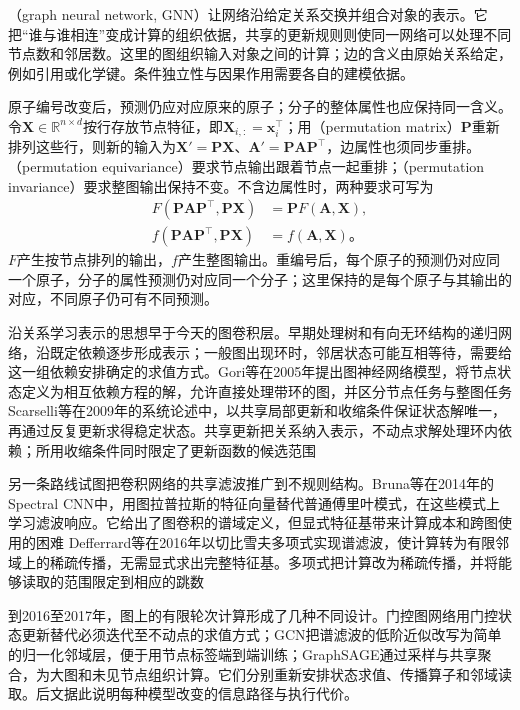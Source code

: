 （graph neural network, GNN）让网络沿给定关系交换并组合对象的表示。它把“谁与谁相连”变成计算的组织依据，共享的更新规则则使同一网络可以处理不同节点数和邻居数。这里的图组织输入对象之间的计算；边的含义由原始关系给定，例如引用或化学键。条件独立性与因果作用需要各自的建模依据。

原子编号改变后，预测仍应对应原来的原子；分子的整体属性也应保持同一含义。令$\bm{X}\in\mathbb{R}^{n\times d}$按行存放节点特征，即$\bm{X}_{i,:}=\bm{x}_i^{\top}$；用（permutation matrix）$\bm{P}$重新排列这些行，则新的输入为$\bm{X}'=\bm{P}\bm{X}$、$\bm{A}'=\bm{P}\bm{A}\bm{P}^{\top}$，边属性也须同步重排。（permutation equivariance）要求节点输出跟着节点一起重排；（permutation invariance）要求整图输出保持不变。不含边属性时，两种要求可写为
\begin{equation}
  \begin{aligned}
    F(\bm{P}\bm{A}\bm{P}^{\top},\bm{P}\bm{X})
      &=\bm{P}F(\bm{A},\bm{X}),\\
    f(\bm{P}\bm{A}\bm{P}^{\top},\bm{P}\bm{X})
      &=f(\bm{A},\bm{X})\text{。}
  \end{aligned}
  \label{eq:gnn-permutation}
\end{equation}
$F$产生按节点排列的输出，$f$产生整图输出。重编号后，每个原子的预测仍对应同一个原子，分子的属性预测仍对应同一个分子；这里保持的是每个原子与其输出的对应，不同原子仍可有不同预测。

沿关系学习表示的思想早于今天的图卷积层。早期处理树和有向无环结构的递归网络，沿既定依赖逐步形成表示；一般图出现环时，邻居状态可能互相等待，需要给这一组依赖安排确定的求值方式。Gori等在2005年提出图神经网络模型，将节点状态定义为相互依赖方程的解，允许直接处理带环的图，并区分节点任务与整图任务 Scarselli等在2009年的系统论述中，以共享局部更新和收缩条件保证状态解唯一，再通过反复更新求得稳定状态。共享更新把关系纳入表示，不动点求解处理环内依赖；所用收缩条件同时限定了更新函数的候选范围

另一条路线试图把卷积网络的共享滤波推广到不规则结构。Bruna等在2014年的Spectral CNN中，用图拉普拉斯的特征向量替代普通傅里叶模式，在这些模式上学习滤波响应。它给出了图卷积的谱域定义，但显式特征基带来计算成本和跨图使用的困难 Defferrard等在2016年以切比雪夫多项式实现谱滤波，使计算转为有限邻域上的稀疏传播，无需显式求出完整特征基。多项式把计算改为稀疏传播，并将能够读取的范围限定到相应的跳数

到2016至2017年，图上的有限轮次计算形成了几种不同设计。门控图网络用门控状态更新替代必须迭代至不动点的求值方式；GCN把谱滤波的低阶近似改写为简单的归一化邻域层，便于用节点标签端到端训练；GraphSAGE通过采样与共享聚合，为大图和未见节点组织计算。它们分别重新安排状态求值、传播算子和邻域读取。后文据此说明每种模型改变的信息路径与执行代价。

